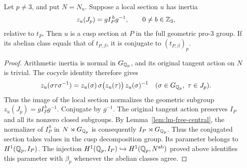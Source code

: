 \begin{lemma}
\label{lem:lm-nonzero-inertia-cusp}
Let $p\ne3$, and put $N=N_n$. Suppose a local section $u$ has inertia
\[
 z_u(J_p)=g I_P^{\,b}g^{-1},\qquad 0\ne b\in\mathbb Z_3,
\]
relative to $t_P$.  Then $u$ is a cusp section at $P$ in the full
geometric pro-$3$ group.  If its abelian class equals that of
$t_{P,\beta}$, it is conjugate to $(t_{P,\beta})_p$.
\end{lemma}
\begin{proof}
Arithmetic inertia is normal in $G_{\mathbb Q_p}$, and its original tangent
action on $N$ is trivial.  The cocycle identity therefore gives
\[
 z_u(\sigma\tau\sigma^{-1})
 =z_u(\sigma)\,\sigma\bigl(z_u(\tau)\bigr)\,z_u(\sigma)^{-1}
 \quad(\sigma\in G_{\mathbb Q_p},\ \tau\in J_p).
\]
Thus the image of the local section normalizes the geometric subgroup
$z_u(J_p)=g I_P^{\,b}g^{-1}$.  Conjugate by $g^{-1}$.
The original tangent action preserves $I_P$ and all its nonzero closed
subgroups.  By Lemma~\ref{lem:lm-free-central}, the normalizer of
$I_P^{\,b}$ in $N\rtimes G_{\mathbb Q_p}$ is consequently
$I_P\rtimes G_{\mathbb Q_p}$.  Thus the conjugated section takes values in
the cusp decomposition group.  Its parameter belongs to
$H^1(\mathbb Q_p,I_P)$.  The injection
$H^1(\mathbb Q_p,I_P)\hookrightarrow H^1(\mathbb Q_p,N^{\rm ab})$
proved above identifies this parameter with $\beta_p$ whenever the
abelian classes agree.
\end{proof}

